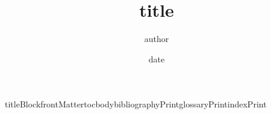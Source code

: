 \documentclass[{{paper}}]{{{documentClass}}}
\title{ {{title}} }\author{ {{author}} }\date{ {{date}} }
\begin{document}
{{titleBlock}}{{frontMatter}}{{toc}}{{body}}{{bibliographyPrint}}{{glossaryPrint}}{{indexPrint}}
\end{document}

